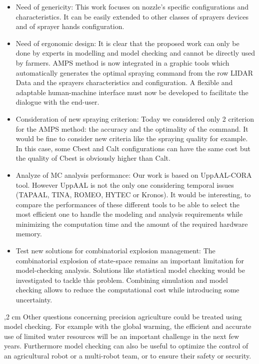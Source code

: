 \documentclass[preprint,3p,times,twocolumn]{elsarticle}
\begin{document}
\begin{itemize}
\item Need of genericity: This work focuses on nozzle's specific configurations and characteristics. It can be easily extended to other classes of sprayers devices and of sprayer hands configuration.
\item Need of ergonomic design: It is clear that the proposed work can only be done by experts in modelling and model checking and cannot be directly used by farmers. AMPS method is now integrated in a graphic tools which automatically generates the optimal spraying command from the row LIDAR Data and the sprayers characteristics and configuration. A flexible and adaptable human-machine interface must now be developed to facilitate the dialogue with the end-user.
\item Consideration of new spraying criterion: Today we considered only 2 criterion for the AMPS method: the accuracy and the optimality of the command. It would be fine to consider new criteria like the spraying quality for example. In this case, some Cbest and Calt configurations can have the same cost but the quality of Cbest is obviously higher than Calt.
\item Analyze of MC analysis performance: Our work is based on UppAAL-CORA tool. However UppAAL is not the only one considering temporal issues (TAPAAL, TINA, ROMEO, HYTEC or Kronos). It would be interesting, to compare the performances of these different tools to be able to select the most efficient one to handle the modeling and analysis requirements while minimizing the computation time and the amount of the required hardware memory.
\item Test new solutions for combinatorial explosion management: The combinatorial explosion of state-space remains an important limitation for model-checking analysis. Solutions like statistical model checking \cite{MCS_2010} \cite{MCS_2013} would be investigated to tackle this problem. Combining simulation and model checking allows to reduce the computational cost while introducing some uncertainty. 
\end{itemize}
,2 cm
Other questions concerning precision agriculture could be treated using model checking. For example with the global warming, the efficient and accurate use of limited water resources will be an important challenge in the next few years. Furthermore model checking can also be useful to optimize the control of an agricultural robot or a multi-robot team, or to ensure their safety or security.
\end{document}
